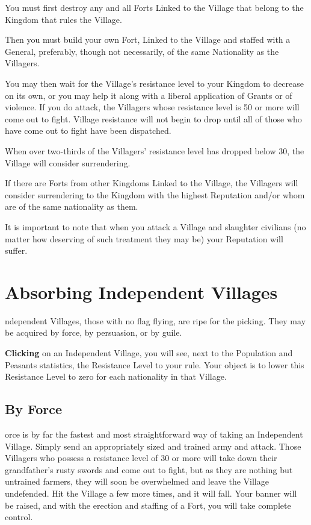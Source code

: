 You must first destroy any and all Forts Linked to the Village that belong to the Kingdom that rules the Village.

Then you must build your own Fort, Linked to the Village and staffed with a General, preferably, though not necessarily, of the same Nationality as the Villagers.

You may then wait for the Village’s resistance level to your Kingdom to decrease on its own, or you may help it along with a liberal application of Grants or of violence. If you do attack, the Villagers whose resistance level is 50 or more will come out to fight. Village resistance will not begin to drop until all of those who have come out to fight have been dispatched.

When over two-thirds of the Villagers’ resistance level has dropped below 30, the Village will consider surrendering.

If there are Forts from other Kingdoms Linked to the Village, the Villagers will consider surrendering to the Kingdom with the highest Reputation and/or whom are of the same nationality as them.

It is important to note that when you attack a Village and slaughter civilians (no matter how deserving of such treatment they may be) your Reputation will suffer.

\section{\textsf{Absorbing Independent Villages}}

ndependent Villages, those with no flag flying, are ripe for the picking. They may be acquired by force, by persuasion, or by guile.

\textbf{Clicking} on an Independent Village, you will see, next to the Population and Peasants statistics, the Resistance Level to your rule. Your object is to lower this Resistance Level to zero for each nationality in that Village.

\subsection{\textsf{By Force}}


orce is by far the fastest and most straightforward way of taking an Independent Village. Simply send an appropriately sized and trained army and attack. Those Villagers who possess a resistance level of 30 or more will take down their grandfather’s rusty swords and come out to fight, but as they are nothing but untrained farmers, they will soon be overwhelmed and leave the Village undefended. Hit the Village a few more times, and it will fall. Your banner will be raised, and with the erection and staffing of a Fort, you will take complete control.

